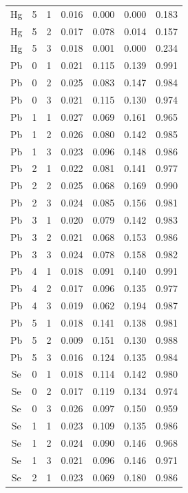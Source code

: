 \documentclass[ms, hidelinks]{uncgdissertationexp3}
\theoremstyle{plain}
\theoremstyle{definition}
\theoremstyle{remark}
\begin{document}
\begin{longtable}{ccccccc}
  Hg & 5 & 1 & 0.016 & 0.000 & 0.000 & 0.183\\
  \rowcolor{gray!6}  Hg & 5 & 2 & 0.017 & 0.078 & 0.014 & 0.157\\
  Hg & 5 & 3 & 0.018 & 0.001 & 0.000 & 0.234\\
  \rowcolor{gray!6}  Pb & 0 & 1 & 0.021 & 0.115 & 0.139 & 0.991\\
  Pb & 0 & 2 & 0.025 & 0.083 & 0.147 & 0.984\\
  \rowcolor{gray!6}  Pb & 0 & 3 & 0.021 & 0.115 & 0.130 & 0.974\\
  Pb & 1 & 1 & 0.027 & 0.069 & 0.161 & 0.965\\
  \rowcolor{gray!6}  Pb & 1 & 2 & 0.026 & 0.080 & 0.142 & 0.985\\
  Pb & 1 & 3 & 0.023 & 0.096 & 0.148 & 0.986\\
  \rowcolor{gray!6}  Pb & 2 & 1 & 0.022 & 0.081 & 0.141 & 0.977\\
  Pb & 2 & 2 & 0.025 & 0.068 & 0.169 & 0.990\\
  \rowcolor{gray!6}  Pb & 2 & 3 & 0.024 & 0.085 & 0.156 & 0.981\\
  Pb & 3 & 1 & 0.020 & 0.079 & 0.142 & 0.983\\
  \rowcolor{gray!6}  Pb & 3 & 2 & 0.021 & 0.068 & 0.153 & 0.986\\
  Pb & 3 & 3 & 0.024 & 0.078 & 0.158 & 0.982\\
  \rowcolor{gray!6}  Pb & 4 & 1 & 0.018 & 0.091 & 0.140 & 0.991\\
  Pb & 4 & 2 & 0.017 & 0.096 & 0.135 & 0.977\\
  \rowcolor{gray!6}  Pb & 4 & 3 & 0.019 & 0.062 & 0.194 & 0.987\\
  Pb & 5 & 1 & 0.018 & 0.141 & 0.138 & 0.981\\
  \rowcolor{gray!6}  Pb & 5 & 2 & 0.009 & 0.151 & 0.130 & 0.988\\
  Pb & 5 & 3 & 0.016 & 0.124 & 0.135 & 0.984\\
  \rowcolor{gray!6}  Se & 0 & 1 & 0.018 & 0.114 & 0.142 & 0.980\\
  Se & 0 & 2 & 0.017 & 0.119 & 0.134 & 0.974\\
  \rowcolor{gray!6}  Se & 0 & 3 & 0.026 & 0.097 & 0.150 & 0.959\\
  Se & 1 & 1 & 0.023 & 0.109 & 0.135 & 0.986\\
  \rowcolor{gray!6}  Se & 1 & 2 & 0.024 & 0.090 & 0.146 & 0.968\\
  Se & 1 & 3 & 0.021 & 0.096 & 0.146 & 0.971\\
  \rowcolor{gray!6}  Se & 2 & 1 & 0.023 & 0.069 & 0.180 & 0.986\\

\end{longtable}
\end{document}
